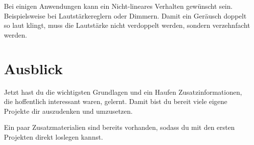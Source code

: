 \documentclass[a4paper,12pt]{book}
\begin{document}
Bei einigen Anwendungen kann ein Nicht-lineares Verhalten gewünscht sein.
Beispielsweise bei Lautstärkereglern oder Dimmern.
Damit ein Geräusch doppelt so laut klingt, muss die Lautstärke nicht verdoppelt werden, sondern verzehnfacht werden.


\section*{Ausblick}

Jetzt hast du die wichtigsten Grundlagen und ein Haufen Zusatzinformationen, 
die hoffentlich interessant waren, gelernt.
Damit bist du bereit viele eigene Projekte dir auszudenken und umzusetzen.

Ein paar Zusatzmaterialien sind bereits vorhanden, sodass du mit den ersten 
Projekten direkt loslegen kannst.
\end{document}
